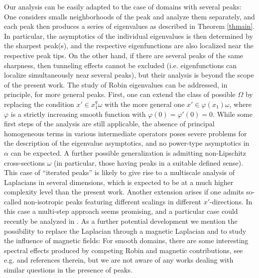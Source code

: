 \documentclass[11pt,oneside,reqno,a4paper]{amsart}
\theoremstyle{definition}
\begin{document}
Our analysis can be easily adapted to the case of domains with several peaks: One considers smalls neighborhoods of the peak and
analyze them separately, and each peak then produces a series of eigenvalues as described in Theorem \ref{thmain}. In particular, the asymptotics of the individual eigenvalues is then determined by the sharpest peak(s), and the respective eigenfunctions are also localized near the respective peak tips. On the other hand, if there are several peaks
of the same sharpness, then tunneling effects cannot be excluded (i.e. eigenfunctions can localize simultaneously near several peaks), but their analysis is beyond the scope of the present work. The study of Robin eigenvalues can be addressed, in principle, for more general peaks. First, one can extend the class of possible $\Omega$ by replacing the condition $x'\in x_1^q\omega$ with the more general one %
 $x'\in \varphi(x_1)\omega$, where $\varphi$ is a strictly increasing smooth function with $\varphi(0)=\varphi'(0)=0$. While some first steps of the analysis are still applicable, the absence of principal homogeneous terms in various intermediate operators poses severe problems for the description of the eigenvalue asymptotics, and no power-type asymptotics in $\alpha$ can be expected. A further possible generalization is admitting non-Lipschitz cross-sections $\omega$ (in particular, those having peaks in a suitable defined sense). This case of ``iterated peaks'' is likely to give rise to a multiscale analysis of Laplacians in several dimensions, which is expected to be at a much higher complexity level than the present work. Another extension arises if one admits so-called non-isotropic peaks
featuring different scalings in different $x'$-directions. In this case a multi-step approach seems promising, and a particular case could recently be analyzed in \cite{vogel2}. As a further potential development we mention the possibility to replace the Laplacian through a magnetic Laplacian and to study the influence of magnetic fields: For smooth domains, there are some interesting spectral effects produced by competing Robin and magnetic contributions, see e.g. \cite{fahs, HKR, kach} and references therein, but we are not aware of any works dealing with similar questions in the presence of peaks.
\end{document}
